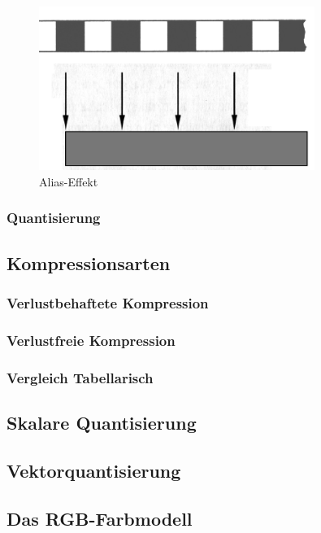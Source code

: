 \begin{figure}
	\centering
		\includegraphics[width=0.8\textwidth]{img/alias_steph.png}
	\caption[Alias-Effekt]{Alias-Effekt}
	\label{fig:alias_steph}
\end{figure}

\subsubsection{Quantisierung}

\subsection{\textbf{Kompressionsarten}}
\subsubsection{Verlustbehaftete Kompression}
\subsubsection{Verlustfreie Kompression}
\subsubsection{Vergleich Tabellarisch}

\subsection{\textbf{Skalare Quantisierung}}

\subsection{\textbf{Vektorquantisierung}}

\subsection{\textbf{Das RGB-Farbmodell}}

